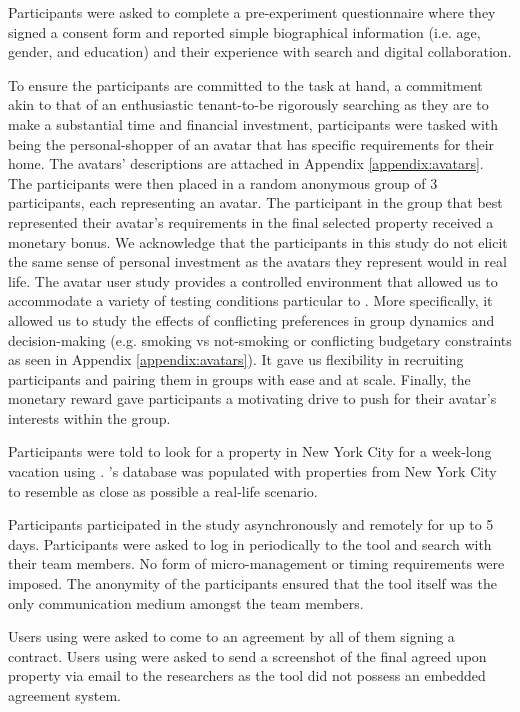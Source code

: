 Participants were asked to complete a pre-experiment questionnaire where they signed a consent form and reported simple biographical information (i.e. age, gender, and education) and their experience with search and digital collaboration. 

To ensure the participants are committed to the task at hand, a commitment akin to that of an enthusiastic tenant-to-be rigorously searching as they are to make a substantial time and financial investment, participants were tasked with being the personal-shopper of an avatar that has specific requirements for their home. The avatars' descriptions are attached in Appendix \ref{appendix:avatars}. The participants were then placed in a random anonymous group of 3 participants, each representing an avatar. The participant in the group that best represented their avatar's requirements in the final selected property received a monetary bonus. We acknowledge that the participants in this study do not elicit the same sense of personal investment as the avatars they represent would in real life. The avatar user study provides a controlled environment that allowed us to accommodate a variety of testing conditions particular to \tool. More specifically, it allowed us to study the effects of conflicting preferences in group dynamics and decision-making (e.g. smoking vs not-smoking or conflicting budgetary constraints as seen in Appendix \ref{appendix:avatars}). It gave us flexibility in recruiting participants and pairing them in groups with ease and at scale. Finally, the monetary reward gave participants a motivating drive to push for their avatar's interests within the group. 

Participants were told to look for a property in New York City for a week-long vacation using \tool. \tool's database was populated with properties from New York City to resemble as close as possible a real-life scenario. 

Participants participated in the study asynchronously and remotely for up to 5 days. Participants were asked to log in periodically to the tool and search with their team members. No form of micro-management or timing requirements were imposed. The anonymity of the participants ensured that the tool itself was the only communication medium amongst the team members. 

Users using \tool were asked to come to an agreement by all of them signing a contract. Users using \baseline were asked to send a screenshot of the final agreed upon property via email to the researchers as the tool did not possess an embedded agreement system. 

